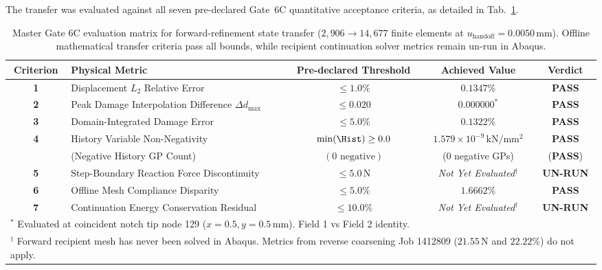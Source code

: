 \begin{enumerate}
The transfer was evaluated against all seven pre-declared Gate~6C quantitative acceptance criteria, as detailed in Tab.~\ref{tab:gate6c_forward_transfer_evaluation}.

\begin{table}[htbp]
\centering
\caption{Master Gate 6C evaluation matrix for forward-refinement state transfer ($2{,}906 \to 14{,}677$ finite elements at $u_{\mathrm{handoff}} = 0.0050\,\mathrm{mm}$). Offline mathematical transfer criteria pass all bounds, while recipient continuation solver metrics remain un-run in Abaqus.}
\label{tab:gate6c_forward_transfer_evaluation}
\small
\begin{tabular}{clccc}
\hline
\textbf{Criterion} & \textbf{Physical Metric} & \textbf{Pre-declared Threshold} & \textbf{Achieved Value} & \textbf{Verdict} \\
\hline
\textbf{1} & Displacement $L_2$ Relative Error & $\le 1.0\%$ & $0.1347\%$ & \textbf{PASS} \\
\textbf{2} & Peak Damage Interpolation Difference $\Delta d_{\max}$ & $\le 0.020$ & $0.000000^*$ & \textbf{PASS} \\
\textbf{3} & Domain-Integrated Damage Error & $\le 5.0\%$ & $0.1322\%$ & \textbf{PASS} \\
\textbf{4} & History Variable Non-Negativity & $\min(\Hist) \ge 0.0$ & $1.579 \times 10^{-9}\,\mathrm{kN/mm^2}$ & \textbf{PASS} \\
 & (Negative History GP Count) & $(0\text{ negative})$ & ($0$ negative GPs) & (\textbf{PASS}) \\
\textbf{5} & Step-Boundary Reaction Force Discontinuity & $\le 5.0\,\mathrm{N}$ & \emph{Not Yet Evaluated}$^\dagger$ & \textbf{UN-RUN} \\
\textbf{6} & Offline Mesh Compliance Disparity & $\le 5.0\%$ & $1.6662\%$ & \textbf{PASS} \\
\textbf{7} & Continuation Energy Conservation Residual & $\le 10.0\%$ & \emph{Not Yet Evaluated}$^\dagger$ & \textbf{UN-RUN} \\
\hline
\multicolumn{5}{l}{\footnotesize $^*$ Evaluated at coincident notch tip node 129 ($x=0.5, y=0.5\,\mathrm{mm}$). Field 1 vs Field 2 identity.} \\
\multicolumn{5}{l}{\footnotesize $^\dagger$ Forward recipient mesh has never been solved in Abaqus. Metrics from reverse coarsening Job 1412809 ($21.55\,\mathrm{N}$ and $22.22\%$) do not apply.}
\end{tabular}
\end{table}


\end{enumerate}
